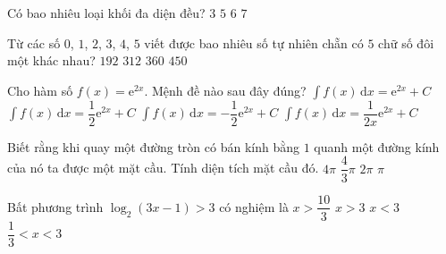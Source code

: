 \begin{ex}%
Có bao nhiêu loại khối đa diện đều?
\choice
{$3$}
{\True $5$}
{$6$}
{$7$}
\end{ex}

\begin{ex}%
Từ các số $0$, $1$, $2$, $3$, $4$, $5$ viết được bao nhiêu số tự nhiên chẵn có $5$ chữ số đôi một khác nhau?
\choice
{$192$}
{\True $312$}
{$360$}
{$450$}
\end{ex}

\begin{ex}%
Cho hàm số $f(x)=\mathrm{e}^{2x}$. Mệnh đề nào sau đây đúng?
\choice
{$\displaystyle\int f(x)\mathrm{\,d}x=\mathrm{e}^{2x}+C$
}
{\True $\displaystyle\int f(x)\mathrm{\,d}x=\dfrac{1}{2}\mathrm{e}^{2x}+C$
}
{$\displaystyle\int f(x)\mathrm{\,d}x=-\dfrac{1}{2}\mathrm{e}^{2x}+C$
}
{$\displaystyle\int f(x)\mathrm{\,d}x=\dfrac{1}{2x}\mathrm{e}^{2x}+C$
}
\end{ex}

\begin{ex}%
Biết rằng khi quay một đường tròn có bán kính bằng $1$ quanh một đường kính của nó ta được một mặt cầu. Tính diện tích mặt cầu đó.
\choice
{\True $4\pi$}
{$\dfrac{4}{3}\pi$}
{$2\pi$}
{$\pi$}
\end{ex}

\begin{ex}%
Bất phương trình $\log_2(3x-1)>3$ có nghiệm là
\choice
{$x>\dfrac{10}{3}$}
{\True $x>3$}
{$x<3$}
{$\dfrac{1}{3}<x<3$}
\end{ex}

